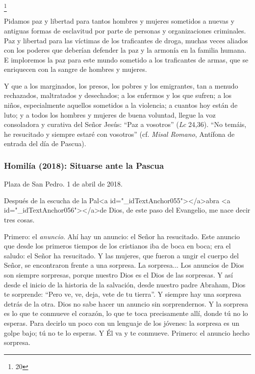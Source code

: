 			\begin{body}[...] \footnote{20}\end{body}
			
			\begin{body}Pidamos paz y libertad para tantos hombres y mujeres sometidos a nuevas y antiguas formas de esclavitud por parte de personas y organizaciones criminales. Paz y libertad para las víctimas de los traficantes de droga, muchas veces aliados con los poderes que deberían defender la paz y la armonía en la familia humana. E imploremos la paz para este mundo sometido a los traficantes de armas, que se enriquecen con la sangre de hombres y mujeres.\end{body}
			
			\begin{body}Y que a los marginados, los presos, los pobres y los emigrantes, tan a menudo rechazados, maltratados y desechados; a los enfermos y los que sufren; a los niños, especialmente aquellos sometidos a la violencia; a cuantos hoy están de luto; y a todos los hombres y mujeres de buena voluntad, llegue la voz consoladora y curativa del Señor Jesús: “Paz a vosotros” (\textit{Lc} 24,36). “No temáis, he resucitado y siempre estaré con vosotros” (cf. \textit{Misal Romano}, Antífona de entrada del día de Pascua).\end{body}
			
			\subsubsection{Homilía (2018): Situarse ante la Pascua}
			
			\begin{referencia}Plaza de San Pedro. 1 de abril de 2018.\end{referencia}
			
			\begin{body}Después de la escucha de la Pal<a id="_idTextAnchor055"></a>abra <a id="_idTextAnchor056"></a>de Dios, de este paso del Evangelio, me nace decir tres cosas.\end{body}
			
			\begin{body}Primero: el \textit{anuncio}. Ahí hay un anuncio: el Señor ha resucitado. Este anuncio que desde los primeros tiempos de los cristianos iba de boca en boca; era el saludo: el Señor ha resucitado. Y las mujeres, que fueron a ungir el cuerpo del Señor, se encontraron frente a una sorpresa. La sorpresa... Los anuncios de Dios son siempre sorpresas, porque nuestro Dios es el Dios de las sorpresas. Y así desde el inicio de la historia de la salvación, desde nuestro padre Abraham, Dios te sorprende: “Pero ve, ve, deja, vete de tu tierra”. Y siempre hay una sorpresa detrás de la otra. Dios no sabe hacer un anuncio sin sorprendernos. Y la sorpresa es lo que te conmueve el corazón, lo que te toca precisamente allí, donde tú no lo esperas. Para decirlo un poco con un lenguaje de los jóvenes: la sorpresa es un golpe bajo; tú no te lo esperas. Y Él va y te conmueve. Primero: el anuncio hecho sorpresa.\end{body}
			
